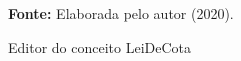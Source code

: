 \begin{figure}[ht!]
\centering

\caption{\textmd{Editor do conceito LeiDeCota}}
\label{fig:editorleicota}

\par\medskip\textbf{Fonte:} Elaborada pelo autor (2020). \par\medskip

\end{figure}

